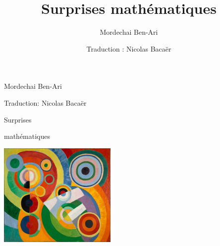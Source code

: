 \documentclass[openany]{book}
\theoremstyle{definition}
\theoremstyle{remark}
\theoremstyle{plain}
\begin{document}
\sloppy

\author{Mordechai Ben-Ari}
\title{Surprises mathématiques}
\date{Traduction : Nicolas Bacaër}



\pagestyle{empty}

\begin{center}
{\huge Mordechai Ben-Ari}\\

\vspace{1cm}

{\Large Traduction: Nicolas Bacaër}





\vspace{2cm}

\centerline{\fontsize{52}{52}\selectfont Surprises}

\centerline{\fontsize{52}{52}\selectfont mathématiques}

   
    \vspace{2cm}

\includegraphics[height=5cm]{Delaunay2}
    \end{center}


\normalsize

\frontmatter



\maketitle

\lhead[\fancyplain{}{}]%
{\fancyplain{}{}}
\rhead[\fancyplain{}{}]%
{\fancyplain{}{}}
\cfoot{}
\pagestyle{fancyplain}



\mainmatter

\rhead[\fancyplain{}{}]%
{\fancyplain{}{\thepage}}
\cfoot{}
\pagestyle{fancyplain}
\end{document}
